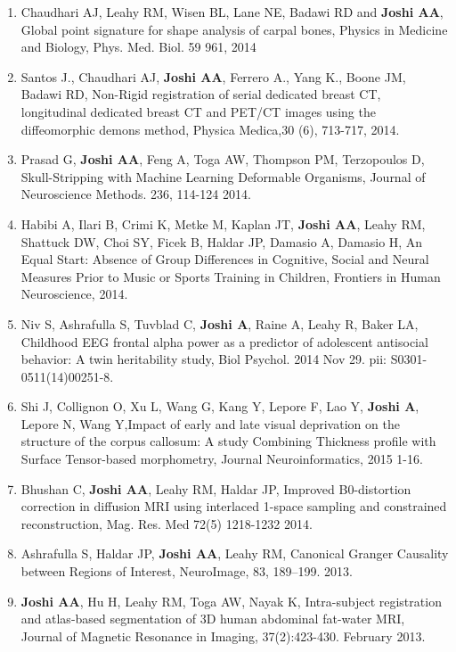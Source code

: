 \documentclass[overlapped,line,letterpaper]{res}
\begin{document}
\begin{resume}
\begin{enumerate}
    \item Chaudhari AJ, Leahy RM, Wisen BL, Lane NE, Badawi RD and \textbf{Joshi AA}, {Global point signature for shape analysis of carpal bones}, Physics in Medicine and Biology,  Phys. Med. Biol. 59 961, 2014

    \item Santos J., Chaudhari AJ, \textbf{Joshi AA}, Ferrero A., Yang K., Boone JM, Badawi RD, {Non-Rigid registration of serial dedicated breast CT, longitudinal dedicated breast CT and PET/CT images using the diffeomorphic demons method}, Physica Medica,30 (6), 713-717, 2014.

    \item Prasad G, \textbf{Joshi AA}, Feng A, Toga AW, Thompson PM, Terzopoulos D, {Skull-Stripping with Machine Learning Deformable Organisms},  Journal of Neuroscience Methods.  236, 114-124 2014.

    \item Habibi A, Ilari B, Crimi K, Metke M, Kaplan JT, \textbf{Joshi AA}, Leahy RM, Shattuck DW, Choi SY, Ficek B, Haldar JP, Damasio A, Damasio H, {An Equal Start: Absence of Group Differences in Cognitive, Social and Neural Measures Prior to Music or Sports Training in Children},  Frontiers in Human Neuroscience, 2014.

    \item Niv S, Ashrafulla S, Tuvblad C, \textbf{Joshi A}, Raine A, Leahy R, Baker LA, {Childhood EEG frontal alpha power as a predictor of adolescent antisocial behavior: A twin heritability study}, Biol Psychol. 2014 Nov 29. pii: S0301-0511(14)00251-8.

    \item Shi J, Collignon O, Xu L, Wang G, Kang Y, Lepore F, Lao Y, \textbf{Joshi A}, Lepore N, Wang Y,{Impact of early and late visual deprivation on the structure of the corpus callosum: A study Combining Thickness profile with Surface Tensor-based morphometry}, Journal Neuroinformatics, 2015 1-16.

    \item Bhushan C, \textbf{Joshi AA}, Leahy RM, Haldar JP, {Improved B0-distortion correction in diffusion MRI using interlaced 1-space sampling and constrained reconstruction}, Mag. Res. Med 72(5) 1218-1232 2014.

    \item Ashrafulla S, Haldar JP, \textbf{Joshi AA}, Leahy RM, {Canonical Granger Causality between Regions of Interest}, NeuroImage, 83, 189–199. 2013.

    \item \textbf{Joshi AA}, Hu H, Leahy RM, Toga AW, Nayak K, {Intra-subject registration and atlas-based segmentation of 3D human abdominal fat-water MRI}, Journal of Magnetic Resonance in Imaging,  37(2):423-430. February 2013.


\end{enumerate}
\end{resume}
\end{document}

